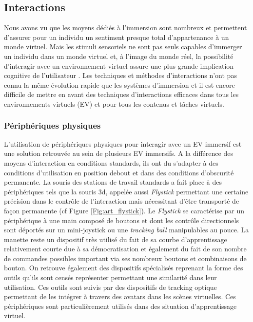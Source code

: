 \subsection{Interactions}

Nous avons vu que les moyens dédiés à l'immersion sont nombreux et permettent d'assurer pour un individu un sentiment presque total d'appartenance à un monde virtuel.
Mais les stimuli sensoriels ne sont pas seuls capables d'immerger un individu dans un monde virtuel et, à l'image du monde réel, la possibilité d'interagir avec un environnement virtuel assure une plus grande implication cognitive de l'utilisateur \cite{steuer1995defining}. Les techniques et méthodes d'interactions n'ont pas connu la même évolution rapide que les systèmes d'immersion et il est encore difficile de mettre en avant des techniques d'interactions efficaces dans tous les environnements virtuels (EV) et pour tous les contenus et tâches virtuels.

\subsubsection{Périphériques physiques} \label{peripheriques}

L'utilisation de périphériques physiques pour interagir avec un EV immersif est une solution retrouvée au sein de plusieurs EV immersifs. A la différence des moyens d'interaction en conditions standards, ils ont du s'adapter à des conditions d'utilisation en position debout et dans des conditions d'obscurité permanente. La souris des stations de travail standards a fait place à des périphériques tels que la souris 3d, appelée aussi \textit{Flystick} permettant une certaine précision dans le contrôle de l'interaction mais nécessitant d'être transporté de façon permanente (cf Figure \ref{Fig:art_flystick}). Le \textit{Flystick} se caractérise par un périphérique à une main composé de boutons et dont les contrôle directionnels sont déportés sur un mini-joystick ou une \textit{tracking ball} manipulables au pouce. La manette reste un dispositif très utilisé du fait de sa courbe d'apprentissage relativement courte due à sa démocratisation et également du fait de son nombre de commandes possibles important via ses nombreux boutons et combinaisons de bouton.
On retrouve également des dispositifs spécialisés reprenant la forme des outils qu'ils sont censés représenter permettant une similarité dans leur utilisation. Ces outils sont suivis par des dispositifs de tracking optique permettant de les intégrer à travers des avatars dans les scènes virtuelles. Ces périphériques sont particulièrement utilisés dans des situation d'apprentissage virtuel.

